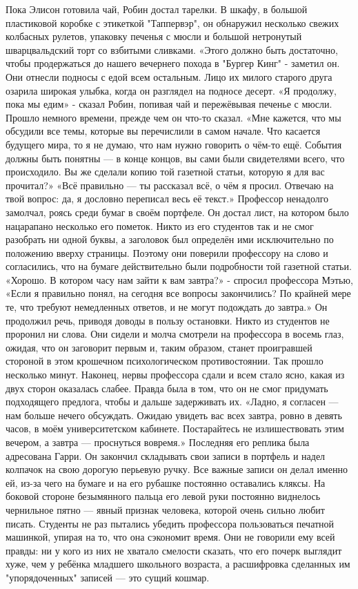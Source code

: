\documentclass[a4paper,12pt]{book}
\begin{document}
	Пока Элисон готовила чай, Робин достал тарелки. В шкафу, в большой пластиковой коробке с этикеткой "Таппервэр", он обнаружил несколько свежих колбасных рулетов, упаковку печенья с мюсли и большой нетронутый шварцвальдский торт со взбитыми сливками.
	«Этого должно быть достаточно, чтобы продержаться до нашего вечернего похода в "Бургер Кинг" - заметил он.
	Они отнесли подносы с едой всем остальным. Лицо их милого старого друга озарила широкая улыбка, когда он разглядел на подносе десерт.
	«Я продолжу, пока мы едим» - сказал Робин, попивая чай и пережёвывая печенье с мюсли. Прошло немного времени, прежде чем он что-то сказал.
	«Мне кажется, что мы обсудили все темы, которые вы перечислили в самом начале. Что касается будущего мира, то я не думаю, что нам нужно говорить о чём-то ещё. События должны быть понятны — в конце концов, вы сами были свидетелями всего, что происходило. Вы же сделали копию той газетной статьи, которую я для вас прочитал?»
	«Всё правильно — ты рассказал всё, о чём я просил. Отвечаю на твой вопрос: да, я дословно переписал весь её текст.»
	Профессор ненадолго замолчал, роясь среди бумаг в своём портфеле. Он достал лист, на котором было нацарапано несколько его пометок. Никто из его студентов так и не смог разобрать ни одной буквы, а заголовок был определён ими исключительно по положению вверху страницы. Поэтому они поверили профессору на слово и согласились, что на бумаге действительно были подробности той газетной статьи.
	«Хорошо. В котором часу нам зайти к вам завтра?» - спросил профессора Мэтью,
	«Если я правильно понял, на сегодня все вопросы закончились? По крайней мере те, что требуют немедленных ответов, и не могут подождать до завтра.»
	Он продолжил речь, приводя доводы в пользу остановки. Никто из студентов не проронил ни слова. Они сидели и молча смотрели на профессора в восемь глаз, ожидая, что он заговорит первым и, таким образом, станет проигравшей стороной в этом крошечном психологическом противостоянии.
	Так прошло несколько минут.
	Наконец, нервы профессора сдали и всем стало ясно, какая из двух сторон оказалась слабее. Правда была в том, что он не смог придумать подходящего предлога, чтобы и дальше задерживать их.
	«Ладно, я согласен — нам больше нечего обсуждать. Ожидаю увидеть вас всех завтра, ровно в девять часов, в моём университетском кабинете. Постарайтесь не излишествовать этим вечером, а завтра — проснуться вовремя.»
	Последняя его реплика была адресована Гарри.
	Он закончил складывать свои записи в портфель и надел колпачок на свою дорогую перьевую ручку. Все важные записи он делал именно ей, из-за чего на бумаге и на его рубашке постоянно оставались кляксы. На боковой стороне безымянного пальца его левой руки постоянно виднелось чернильное пятно — явный признак человека, которой очень сильно любит писать. Студенты не раз пытались убедить профессора пользоваться печатной машинкой, упирая на то, что она сэкономит время. Они не говорили ему всей правды: ни у кого из них не хватало смелости сказать, что его почерк выглядит хуже, чем у ребёнка младшего школьного возраста, а расшифровка сделанных им "упорядоченных" записей — это сущий кошмар.
\end{document}
